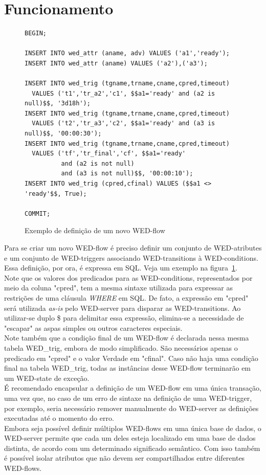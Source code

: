 \documentclass[conference]{IEEEtran}
\begin{document}
\section{Funcionamento}
\begin{figure}[!t]
\begin{Verbatim}[fontsize=\tiny]
BEGIN;

INSERT INTO wed_attr (aname, adv) VALUES ('a1','ready');
INSERT INTO wed_attr (aname) VALUES ('a2'),('a3');

INSERT INTO wed_trig (tgname,trname,cname,cpred,timeout) 
  VALUES ('t1','tr_a2','c1', $$a1='ready' and (a2 is null)$$, '3d18h');
INSERT INTO wed_trig (tgname,trname,cname,cpred,timeout) 
  VALUES ('t2','tr_a3','c2', $$a1='ready' and (a3 is null)$$, '00:00:30');
INSERT INTO wed_trig (tgname,trname,cname,cpred,timeout) 
  VALUES ('tf','tr_final','cf', $$a1='ready' 
          and (a2 is not null) 
          and (a3 is not null)$$, '00:00:10');
INSERT INTO wed_trig (cpred,cfinal) VALUES ($$a1 <> 'ready'$$, True);

COMMIT;
\end{Verbatim}
\caption{Exemplo de definição de um novo WED-flow}
\label{code_new}
\end{figure}
 
Para se criar um novo WED-flow é preciso definir um conjunto de WED-atributes e um conjunto de WED-triggers associando
WED-transitions à WED-conditions. Essa definição, por ora, é expressa em SQL. Veja um exemplo na
figura~\ref{code_new}.
\\
\indent Note que os valores dos predicados para as WED-conditions, representados por meio da coluna "cpred", tem a mesma sintaxe
utilizada para expressar as restrições de uma cláusula \emph{WHERE} em SQL. De fato, a expressão em "cpred" será utilizada \emph{as-is}
pelo WED-server para disparar as WED-transitions. Ao utilizar-se duplo \$ para delimitar essa expressão, elimina-se a necessidade
de "escapar" as aspas simples ou outros caracteres especiais.
\\
\indent  Note também que a condição final de um WED-flow é declarada nessa mesma tabela WED\_trig, embora de modo simplificado.
São necessários apenas o predicado em "cpred" e o valor Verdade em "cfinal". Caso não haja uma condição final na tabela
WED\_trig, todas as instâncias desse WED-flow terminarão em um WED-state de exceção.
\\
\indent É recomendado encapsular a definição de um WED-flow em uma única transação, uma vez que, no caso de um erro de sintaxe
na definição de uma WED-trigger, por exemplo, seria necessário remover manualmente do WED-server as definições executadas
até o momento do erro.
\\
\indent Embora seja possível definir múltiplos WED-flows em uma única base de dados, o WED-server permite que cada um deles 
esteja localizado em uma base de dados distinta, de acordo com um determinado significado semântico. Com isso também é 
possível isolar atributos que não devem ser compartilhados entre diferentes WED-flows. 
\end{document}

